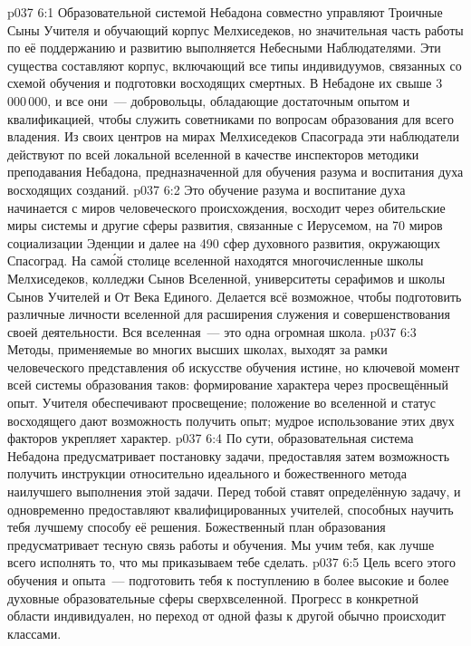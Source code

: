 \vs p037 6:1 Образовательной системой Небадона совместно управляют Троичные Сыны Учителя и обучающий корпус Мелхиседеков, но значительная часть работы по её поддержанию и развитию выполняется Небесными Наблюдателями. Эти существа составляют корпус, включающий все типы индивидуумов, связанных со схемой обучения и подготовки восходящих смертных. В Небадоне их свыше 3\,000\,000, и все они~--- добровольцы, обладающие достаточным опытом и квалификацией, чтобы служить советниками по вопросам образования для всего владения. Из своих центров на мирах Мелхиседеков Спасограда эти наблюдатели действуют по всей локальной вселенной в качестве инспекторов методики преподавания Небадона, предназначенной для обучения разума и воспитания духа восходящих созданий.
\vs p037 6:2 Это обучение разума и воспитание духа начинается с миров человеческого происхождения, восходит через обительские миры системы и другие сферы развития, связанные с Иерусемом, на 70 миров социализации Эденции и далее на 490 сфер духовного развития, окружающих Спасоград. На сам\'ой столице вселенной находятся многочисленные школы Мелхиседеков, колледжи Сынов Вселенной, университеты серафимов и школы Сынов Учителей и От Века Единого. Делается всё возможное, чтобы подготовить различные личности вселенной для расширения служения и совершенствования своей деятельности. Вся вселенная~--- это одна огромная школа.
\vs p037 6:3 \pc Методы, применяемые во многих высших школах, выходят за рамки человеческого представления об искусстве обучения истине, но ключевой момент всей системы образования таков: формирование характера через просвещённый опыт. Учителя обеспечивают просвещение; положение во вселенной и статус восходящего дают возможность получить опыт; мудрое использование этих двух факторов укрепляет характер.
\vs p037 6:4 По сути, образовательная система Небадона предусматривает постановку задачи, предоставляя затем возможность получить инструкции относительно идеального и божественного метода наилучшего выполнения этой задачи. Перед тобой ставят определённую задачу, и одновременно предоставляют квалифицированных учителей, способных научить тебя лучшему способу её решения. Божественный план образования предусматривает тесную связь работы и обучения. Мы учим тебя, как лучше всего исполнять то, что мы приказываем тебе сделать.
\vs p037 6:5 Цель всего этого обучения и опыта~--- подготовить тебя к поступлению в более высокие и более духовные образовательные сферы сверхвселенной. Прогресс в конкретной области индивидуален, но переход от одной фазы к другой обычно происходит классами.
